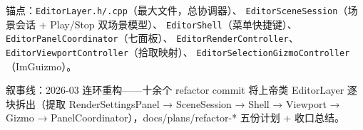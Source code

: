 锚点：\texttt{EditorLayer.h/.cpp}（最大文件，总协调器）、
\texttt{EditorSceneSession}（场景会话 + Play/Stop 双场景模型）、
\texttt{EditorShell}（菜单快捷键）、\texttt{EditorPanelCoordinator}（七面板）、
\texttt{EditorRenderController}、\texttt{EditorViewportController}（拾取映射）、
\texttt{EditorSelectionGizmoController}（ImGuizmo）。

叙事线：2026-03 连环重构——十余个 refactor commit 将上帝类 EditorLayer
逐块拆出（提取 RenderSettingsPanel → SceneSession → Shell → Viewport →
Gizmo → PanelCoordinator），docs/plans/refactor-* 五份计划 + 收口总结。

